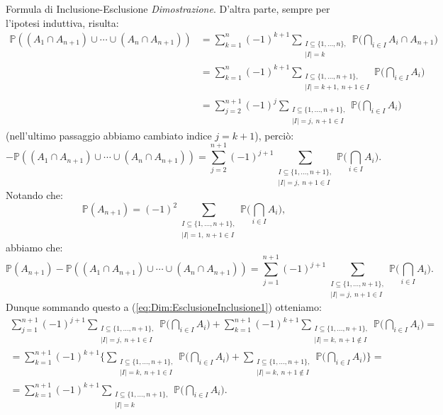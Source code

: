\documentclass[11pt]{book}
\makeatletter
\theoremstyle{Definizione}
\theoremstyle{TeoremaProposizioneLemmaCorollario}
\theoremstyle{OsservazioneNota}
\renewenvironment{proof}[1][\proofname]{\par
  \normalfont \topsep6\p@\@plus6\p@\relax
  \trivlist
  \item[\hskip\labelsep
        \itshape
    #1\@addpunct{.}]\ignorespaces
}{%
  \endtrivlist\@endpefalse
}
\renewcommand{\P}{\mathbb{P}}
\renewenvironment{proof}{\textsl{Dimostrazione}.}{}
\makeatother
\begin{document}
\begin{boxteo}{Formula di Inclusione-Esclusione}
\begin{proof}
D'altra parte, sempre per l'ipotesi induttiva, risulta:
\begin{align*}
\P((A_1 \cap A_{n+1}) \cup \cdots \cup (A_n\cap A_{n+1})) &= \sum_{k = 1}^n (-1)^{k+1} \sum_{\substack{ I \subseteq \{1,\dots,n\},\\ |I| = k}}\P\Bigg(\bigcap_{i\in I} A_i\cap A_{n+1}\Bigg)\\
&= \sum_{k = 1}^n (-1)^{k+1} \sum_{\substack{ I \subseteq \{1,\dots,n+1\},\\ |I| = k+1,\ n+1\in I}}\P\Bigg(\bigcap_{i\in I} A_i\Bigg)\\
&= \sum_{j = 2}^{n+1} (-1)^j \sum_{\substack{ I \subseteq \{1,\dots,n+1\},\\ |I| = j,\ n+1\in I}}\P\Bigg(\bigcap_{i\in I} A_i\Bigg)
\end{align*}
(nell'ultimo passaggio abbiamo cambiato indice $j = k+1$), perciò:
$$
-\P((A_1 \cap A_{n+1}) \cup \cdots \cup (A_n\cap A_{n+1})) = \sum_{j = 2}^{n+1} (-1)^{j+1} \sum_{\substack{ I \subseteq \{1,\dots,n+1\},\\ |I| = j,\ n+1\in I}}\P\Bigg(\bigcap_{i\in I} A_i\Bigg).
$$ 
Notando che:
$$
\P(A_{n+1}) = (-1)^2\sum_{\substack{ I \subseteq \{1,\dots,n+1\},\\ |I| = 1,\ n+1\in I}}\P\Bigg(\bigcap_{i\in I} A_i\Bigg), 
$$
abbiamo che:
$$
\P(A_{n+1})-\P((A_1 \cap A_{n+1}) \cup \cdots \cup (A_n\cap A_{n+1})) = \sum_{j = 1}^{n+1} (-1)^{j+1} \sum_{\substack{ I \subseteq \{1,\dots,n+1\},\\ |I| = j,\ n+1\in I}}\P\Bigg(\bigcap_{i\in I} A_i\Bigg).
$$
Dunque sommando questo a (\ref{eq:Dim:EsclusioneInclusione1}) otteniamo:
\begin{gather*}
\sum_{j = 1}^{n+1} (-1)^{j+1} \sum_{\substack{ I \subseteq \{1,\dots,n+1\},\\ |I| = j,\ n+1\in I}}\P\Bigg(\bigcap_{i\in I} A_i\Bigg) + \sum_{k = 1}^{n+1} (-1)^{k+1} \sum_{\substack{ I \subseteq \{1,\dots,n+1\},\\ |I| = k,\ n+1\notin I}}\P\Bigg(\bigcap_{i\in I} A_i\Bigg) = \\
= \sum_{k = 1}^{n+1} (-1)^{k+1} \Bigg\{ \sum_{\substack{ I \subseteq \{1,\dots,n+1\},\\ |I| = k,\ n+1\in I}}\P\Bigg(\bigcap_{i\in I} A_i\Bigg) + \sum_{\substack{ I \subseteq \{1,\dots,n+1\},\\ |I| = k,\ n+1\notin I}}\P\Bigg(\bigcap_{i\in I} A_i\Bigg) \Bigg\} = \\
=  \sum_{k = 1}^{n+1} (-1)^{k+1} \sum_{\substack{ I \subseteq \{1,\dots,n+1\},\\ |I| = k}} \P\Bigg(\bigcap_{i\in I} A_i\Bigg).
\end{gather*}
\end{proof}
\end{boxteo}
\end{document}
